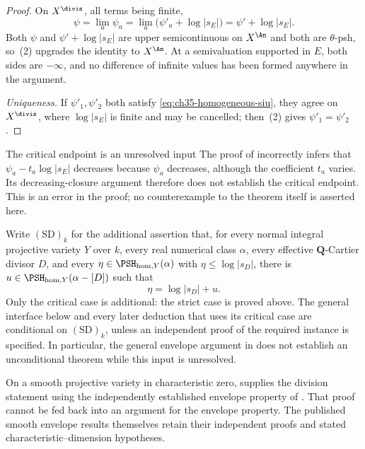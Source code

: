 \begin{proof}
On $X^{\divis}$, all terms being finite,
\[
 \psi=\lim_a\psi_a=\lim_a\bigl(\psi'_a+\log|s_E|\bigr)
 =\psi'+\log|s_E| .
\]
Both $\psi$ and $\psi'+\log|s_E|$ are upper semicontinuous on
$X^{\An}$ and both are $\theta$-psh, so
\,(2) upgrades the identity to
$X^{\An}$.  At a semivaluation supported in $E$, both sides are
$-\infty$, and no difference of infinite values has been formed anywhere
in the argument.

\emph{Uniqueness.}  If $\psi'_1,\psi'_2$ both satisfy
\eqref{eq:ch35-homogeneous-siu}, they agree on $X^{\divis}$, where
$\log|s_E|$ is finite and may be cancelled; then
\,(2) gives $\psi'_1=\psi'_2$.
\end{proof}

\begin{warning}{The critical endpoint is an unresolved input}
\label{warn:ch35-siu-source-gap}
The proof of \cite[Theorem~6.21, pp.~736--737]{BJ22} incorrectly infers
that $\psi_a-t_a\log|s_E|$ decreases because $\psi_a$ decreases, although
the coefficient $t_a$ varies. Its decreasing-closure argument therefore
does not establish the critical endpoint. This is an error in the proof;
no counterexample to the theorem itself is asserted here.

Write $\mathrm{(SD)}_k$ for the additional assertion that, for every normal
integral projective variety $Y$ over $k$, every real numerical class
$\alpha$, every effective $\mathbf Q$-Cartier divisor $D$, and every
$\eta\in\PSH_{\mathrm{hom},Y}(\alpha)$ with $\eta\leq\log|s_D|$, there is
$u\in\PSH_{\mathrm{hom},Y}(\alpha-[D])$ such that
\begin{equation}
\label{eq:ch35-siu-endpoint-input}
                  \eta=\log|s_D|+u .
\end{equation}
Only the critical case is additional: the strict case is proved above.
The general interface below and every later deduction that uses its
critical case are conditional on $\mathrm{(SD)}_k$, unless an independent
proof of the required instance is specified. In particular, the general
envelope argument in
does not establish an unconditional theorem while this input is unresolved.

On a smooth projective variety in characteristic zero,
\cite[Proposition~17]{BJGreen24} supplies the division statement using the
independently established envelope property of \cite[Theorem~A]{BJ22b}.
That proof cannot be fed back into an argument for the envelope property.
The published smooth envelope results themselves retain their independent
proofs and stated characteristic--dimension hypotheses.
\end{warning}


